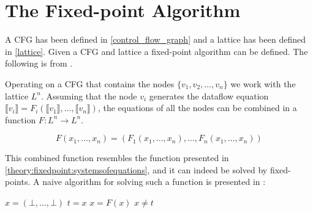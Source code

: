 \section{The Fixed-point Algorithm}\label{fixed_point_algorithm}
A CFG has been defined in \cref{control_flow_graph} and a lattice has been defined in \cref{lattice}.
Given a CFG and lattice a fixed-point algorithm can be defined.
The following is from \citet{schwartzbach}.


Operating on a CFG that contains the nodes $\{ v_1, v_2, \dots, v_n \}$ we work with the lattice $L^n$.
Assuming that the node $v_i$ generates the dataflow equation $\llbracket v_i \rrbracket = F_i ( \llbracket v_1 \rrbracket, \dots, \llbracket v_n \rrbracket)$, the equations of all the nodes can be combined in a function $ F: L^n \rightarrow L^n$.

\[ F(x_1, \dots, x_n) = (F_1(x_1, \dots, x_n), \dots, F_n(x_1, \dots, x_n)) \]

This combined function resembles the function presented in \cref{theory:fixedpoint:systemsofequations}, and it can indeed be solved by fixed-points.
A naive algorithm for solving such a function is presented in \citet{schwartzbach}:

\begin{algorithmic}
  \State $x = (\bot, \dots, \bot)$
  \Do
  \State $t = x$
  \State $x = F(x)$
  \doWhile $ x \ne t $
\end{algorithmic}

